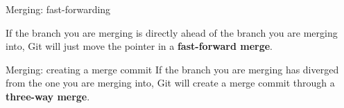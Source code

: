 \documentclass{beeper}
\begin{document}
\begin{frame}{Merging: fast-forwarding}

    If the branch you are merging is directly ahead of the branch you are
    merging into, Git will just move the pointer in a \textbf{fast-forward
    merge}.

    \begin{center}
    \end{center}
\end{frame}

\begin{frame}{Merging: creating a merge commit}
    If the branch you are merging has diverged from the one you are merging
    into, Git will create a merge commit through a \textbf{three-way merge}.

    \begin{center}
    \end{center}
\end{frame}
\end{document}
